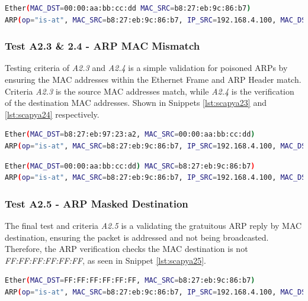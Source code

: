 \documentclass[12pt, oneside]{book}
\begin{document}
\begin{lstlisting}[language=Bash,caption={Scapy A2.2 Test},captionpos=b,label={lst:scapya22}]
Ether(MAC_DST=00:00:aa:bb:cc:dd MAC_SRC=b8:27:eb:9c:86:b7)
ARP(op="is-at", MAC_SRC=b8:27:eb:9c:86:b7, IP_SRC=192.168.4.100, MAC_DST=00:00:aa:bb:cc:dd, IP_DST=192.168.4.50)
\end{lstlisting}

\subsubsection{Test A2.3 \& 2.4 - ARP MAC Mismatch}
Testing criteria of \emph{A2.3} and \emph{A2.4} is a simple validation for poisoned ARPs by ensuring the MAC addresses within the
Ethernet Frame and ARP Header match. Criteria \emph{A2.3} is the source MAC addresses match, while \emph{A2.4} is the verification
of the destination MAC addresses. Shown in Snippets \ref{lst:scapya23} and \ref{lst:scapya24} respectively.

\begin{lstlisting}[language=Bash,caption={Scapy A2.3 Test},captionpos=b,label={lst:scapya23}]
Ether(MAC_DST=b8:27:eb:97:23:a2, MAC_SRC=00:00:aa:bb:cc:dd)
ARP(op="is-at", MAC_SRC=b8:27:eb:9c:86:b7, IP_SRC=192.168.4.100, MAC_DST=b8:27:eb:97:23:a2, IP_DST=192.168.4.50)
\end{lstlisting}
\begin{lstlisting}[language=Bash,caption={Scapy A2.4 Test},captionpos=b,label={lst:scapya24}]
Ether(MAC_DST=00:00:aa:bb:cc:dd) MAC_SRC=b8:27:eb:9c:86:b7)
ARP(op="is-at", MAC_SRC=b8:27:eb:9c:86:b7, IP_SRC=192.168.4.100, MAC_DST=b8:27:eb:97:23:a2, IP_DST=192.168.4.50)
\end{lstlisting}

\subsubsection{Test A2.5 - ARP Masked Destination}
The final test and criteria \emph{A2.5} is a validating the gratuitous ARP reply by MAC destination, ensuring 
the packet is addressed and not being broadcasted. Therefore, the ARP verification checks the MAC destination is not 
\emph{FF:FF:FF:FF:FF:FF}, as seen in Snippet \ref{lst:scapya25}.
\begin{lstlisting}[language=Bash,caption={Scapy A2.5 Test},captionpos=b,label={lst:scapya25}]
Ether(MAC_DST=FF:FF:FF:FF:FF:FF, MAC_SRC=b8:27:eb:9c:86:b7)
ARP(op="is-at", MAC_SRC=b8:27:eb:9c:86:b7, IP_SRC=192.168.4.100, MAC_DST=FF:FF:FF:FF:FF:FF, IP_DST=192.168.4.50)
\end{lstlisting}
\end{document}
